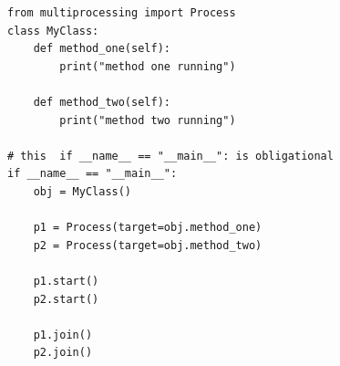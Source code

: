 \documentclass[varwidth,border=10pt]{standalone}
\begin{document}
\begin{verbatim}
from multiprocessing import Process
class MyClass:
    def method_one(self):
        print("method one running")

    def method_two(self):
        print("method two running")

# this  if __name__ == "__main__": is obligational
if __name__ == "__main__":
    obj = MyClass()

    p1 = Process(target=obj.method_one)
    p2 = Process(target=obj.method_two)

    p1.start()
    p2.start()

    p1.join()
    p2.join()
\end{verbatim}
\end{document}
